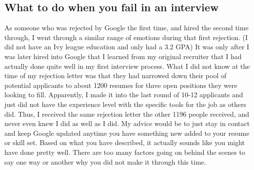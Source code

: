 \documentclass[12pt, reqno, oneside]{amsart}
\begin{document}
\subsection{What to do when you fail in an interview}
As someone who was rejected by Google the first time, and hired the second time through, I went through a similar range of emotions during that first rejection. (I did not have an Ivy league education and only had a 3.2 GPA)
It was only after I was later hired into Google that I learned from my original recruiter that I had actually done quite well in my first interview process. What I did not know at the time of my rejection letter was that they had narrowed down their pool of potential applicants to about 1200 resumes for three open positions they were looking to fill. Apparently, I made it into the last round of 10-12 applicants and just did not have the experience level with the specific tools for the job as others did. Thus, I received the same rejection letter the other 1196 people received, and never even knew I did as well as I did.
My advice would be to just stay in contact and keep Google updated anytime you have something new added to your resume or skill set. Based on what you have described, it actually sounds like you might have done pretty well. There are too many factors going on behind the scenes to say one way or another why you did not make it through this time.
\end{document}

